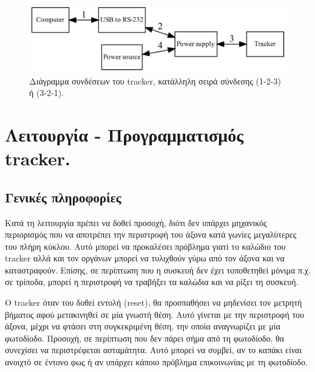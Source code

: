 \documentclass[
  a4paper,
  twoside,
  titlepage,
  11pt]{article}
\numberwithin{equation}{section}
\numberwithin{figure}{section}
\numberwithin{table}{section}
\begin{document}
\begin{figure}

{\centering \includegraphics[width=0.9\linewidth]{figure/trackercomm} 

}

\caption{Διάγραμμα συνδέσεων του tracker, κατάλληλη σειρά σύνδεσης (1-2-3) ή (3-2-1).}\label{fig:trackercomm}
\end{figure}

\newpage

\hypertarget{trackeroperation}{%
\section{Λειτουργία - Προγραμματισμός tracker.}\label{trackeroperation}}

\hypertarget{ux3b3ux3b5ux3bdux3b9ux3baux3adux3c2-ux3c0ux3bbux3b7ux3c1ux3bfux3c6ux3bfux3c1ux3afux3b5ux3c2}{%
\subsection{Γενικές πληροφορίες}\label{ux3b3ux3b5ux3bdux3b9ux3baux3adux3c2-ux3c0ux3bbux3b7ux3c1ux3bfux3c6ux3bfux3c1ux3afux3b5ux3c2}}

Κατά τη λειτουργία πρέπει να δοθεί προσοχή, διότι δεν υπάρχει μηχανικός περιορισμός
που να αποτρέπει την περιστροφή του άξονα κατά γωνίες μεγαλύτερες του πλήρη κύκλου.
Αυτό μπορεί να προκαλέσει πρόβλημα γιατί το καλώδιο του tracker αλλά και τον οργάνων
μπορεί να τυλιχθούν γύρω από τον άξονα και να καταστραφούν. Επίσης, σε περίπτωση που
η συσκευή δεν έχει τοποθετηθεί μόνιμα π.χ. σε τρίποδα, μπορεί η περιστροφή να
τραβήξει τα καλώδια και να ρίξει τη συσκευή.

Ο tracker όταν του δοθεί εντολή (reset), θα προσπαθήσει να μηδενίσει τον μετρητή
βήματος αφού μετακινηθεί σε μία γνωστή θέση. Αυτό γίνεται με την περιστροφή του
άξονα, μέχρι να φτάσει στη συγκεκριμένη θέση, την οποία αναγνωρίζει με μία φωτοδίοδο.
Προσοχή, σε περίπτωση που δεν πάρει σήμα από τη φωτοδίοδο, θα συνεχίσει να
περιστρέφεται ασταμάτητα. Αυτό μπορεί να συμβεί, αν το καπάκι είναι ανοιχτό σε
έντονο φως ή αν υπάρχει κάποιο πρόβλημα επικοινωνίας με τη φωτοδίοδο.
\end{document}
